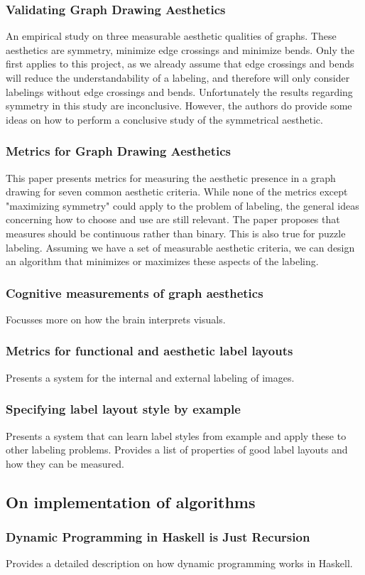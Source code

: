 \documentclass[a4paper]{article}
\begin{document}
\subsubsection{Validating Graph Drawing Aesthetics \cite{purchase1995validating}}
An empirical study on three measurable aesthetic qualities of graphs. These aesthetics are symmetry, minimize edge crossings and minimize bends. Only the first applies to this project, as we already assume that edge crossings and bends will reduce the understandability of a labeling, and therefore will only consider labelings without edge crossings and bends. Unfortunately the results regarding symmetry in this study are inconclusive. However, the authors do provide some ideas on how to perform a conclusive study of the symmetrical aesthetic.\\

\subsubsection{Metrics for Graph Drawing Aesthetics \cite{purchase2002metrics}}
This paper presents metrics for measuring the aesthetic presence in a graph drawing for seven common aesthetic criteria. While none of the metrics except "maximizing symmetry" could apply to the problem of labeling, the general ideas concerning how to choose and use are still relevant. The paper proposes that measures should be continuous rather than binary. This is also true for puzzle labeling. Assuming we have a set of measurable aesthetic criteria, we can design an algorithm that minimizes or maximizes these aspects of the labeling.\\

\subsubsection{Cognitive measurements of graph aesthetics \cite{ware2002cognitive}}
Focusses more on how the brain interprets visuals. \\

\subsubsection{Metrics for functional and aesthetic label layouts \cite{hartmann2005metrics}}
Presents a system for the internal and external labeling of images. \\

\subsubsection{Specifying label layout style by example \cite{vollick2007specifying}}
Presents a system that can learn label styles from example and apply these to other labeling problems. Provides a list of properties of good label layouts and how they can be measured.

\subsection{On implementation of algorithms}

\subsubsection{Dynamic Programming in Haskell is Just Recursion \cite{justrecursion}}
Provides a detailed description on how dynamic programming works in Haskell.

{}

\end{document}

